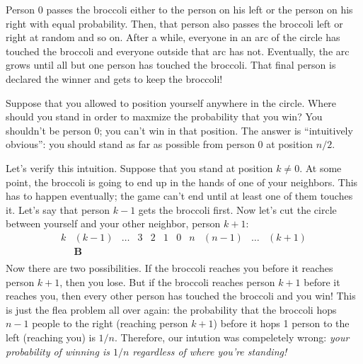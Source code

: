 Person 0 passes the broccoli either to the person on his left or the
person on his right with equal probability.  Then, that person also
passes the broccoli left or right at random and so on.  After a while,
everyone in an arc of the circle has touched the broccoli and everyone
outside that arc has not.  Eventually, the arc grows until all but one
person has touched the broccoli.  That final person is declared the
winner and gets to keep the broccoli!

Suppose that you allowed to position yourself anywhere in the circle.
Where should you stand in order to maxmize the probability that you
win?  You shouldn't be person 0; you can't win in that position.  The
answer is ``intuitively obvious'': you should stand as far as possible
from person 0 at position $n / 2$.

Let's verify this intuition.  Suppose that you stand at position $k
\neq 0$.  At some point, the broccoli is going to end up in the hands
of one of your neighbors.  This has to happen eventually; the game
can't end until at least one of them touches it.  Let's say that
person $k - 1$ gets the broccoli first.  Now let's cut the circle
between yourself and your other neighbor, person $k+1$:
%
\[
\begin{array}{cccccccccccccc}
k & (k-1) & \ldots & 3 & 2 & 1 & 0 & n & (n-1) & \ldots & (k+1) \\
  & \mathbf{B} \\
\end{array}
\]
%
Now there are two possibilities.  If the broccoli reaches you before
it reaches person $k+1$, then you lose.  But if the broccoli reaches
person $k+1$ before it reaches you, then every other person has
touched the broccoli and you win!  This is just the flea problem all
over again: the probability that the broccoli hops $n-1$ people to the
right (reaching person $k+1$) before it hops 1 person to the left
(reaching you) is $1 / n$.  Therefore, our intution was compeletely
wrong: \emph{your probability of winning is $1 / n$ regardless of
where you're standing!}


\endinput
